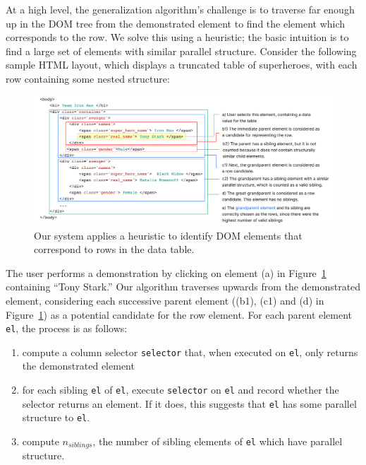 \documentclass[sigconf,10pt]{acmart}
\providecommand{\tightlist}{%
  \setlength{\itemsep}{0pt}\setlength{\parskip}{0pt}}
\begin{document}
At a high level, the generalization algorithm's challenge is to traverse
far enough up in the DOM tree from the demonstrated element to find the
element which corresponds to the row. We solve this using a heuristic;
the basic intuition is to find a large set of elements with similar
parallel structure. Consider the following sample HTML layout, which
displays a truncated table of superheroes, with each row containing some
nested structure:

\begin{figure}
  \includegraphics[width=\textwidth]{media/algorithm.png}
  \caption{\label{fig:algorithm}Our system applies a heuristic to identify DOM elements that correspond to rows in the data table.}
\end{figure}

The user performs a demonstration by clicking on element (a) in
Figure~\ref{fig:algorithm} containing ``Tony Stark.'' Our algorithm
traverses upwards from the demonstrated element, considering each
successive parent element ((b1), (c1) and (d) in
Figure~\ref{fig:algorithm}) as a potential candidate for the row
element. For each parent element \texttt{el}, the process is as follows:

\begin{enumerate}
\def\labelenumi{\arabic{enumi}.}
\tightlist
\item
  compute a column selector \texttt{selector} that, when executed on
  \texttt{el}, only returns the demonstrated element
\item
  for each sibling \texttt{el\textquotesingle{}} of \texttt{el}, execute
  \texttt{selector} on \texttt{el\textquotesingle{}} and record whether
  the selector returns an element. If it does, this suggests that
  \texttt{el\textquotesingle{}} has some parallel structure to
  \texttt{el}.
\item
  compute \(n_{siblings}\), the number of sibling elements of
  \texttt{el} which have parallel structure.
\end{enumerate}
\end{document}
